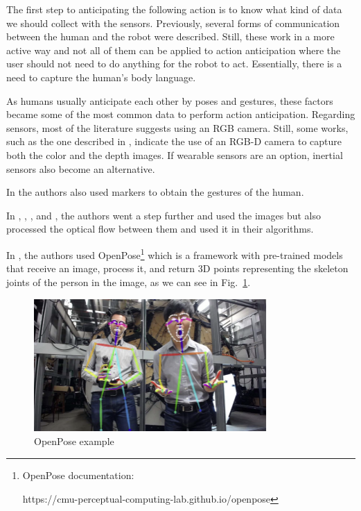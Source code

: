 The first step to anticipating the following action is to know what kind of data we should collect with the sensors. Previously, several forms of communication between the human and the robot were described. Still, these work in a more active way and not all of them can be applied to action anticipation where the user should not need to do anything for the robot to act. Essentially, there is a need to capture the human's body language.

As humans usually anticipate each other by poses and gestures, these factors became some of the most common data to perform action anticipation. Regarding sensors, most of the literature suggests using an RGB camera. Still, some works, such as the one described in \cite{Moutinho2023}, indicate the use of an RGB-D camera to capture both the color and the depth images. If wearable sensors are an option, inertial sensors also become an alternative.

In \cite{Maeda2016} the authors also used markers to obtain the gestures of the human.

In \cite{Gammulle2019}, \cite{Wu2021}, \cite{Rodriguez2019}, and \cite{Furnari2021}, the authors went a step further and used the images but also processed the optical flow between them and used it in their algorithms.

In \cite{Canuto2021}, the authors used OpenPose\footnote{OpenPose documentation:

https://cmu-perceptual-computing-lab.github.io/openpose}\cite{Cao2021}\cite{Simon2017}\cite{Cao2018}\cite{Wei2016} which is a framework with pre-trained models that receive an image, process it, and return 3D points representing the skeleton joints of the person in the image, as we can see in Fig.~\ref{openpose}.

\begin{figure}[H]
\centerline{\includegraphics[width=3.5in]{figs/openpose.PNG}}
\caption{OpenPose example\cite{Cao2021}}
\label{openpose}
\end{figure}

